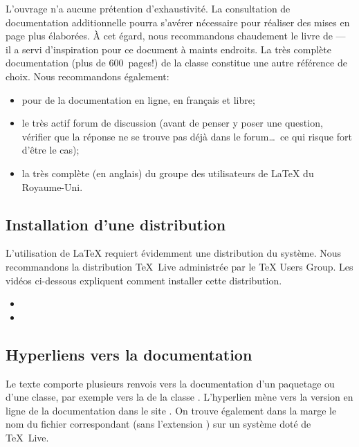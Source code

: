 L'ouvrage n'a aucune prétention d'exhaustivité. La consultation de
documentation additionnelle pourra s'avérer nécessaire pour réaliser
des mises en page plus élaborées. À cet égard, nous recommandons
chaudement le livre de \citet{Kopka:latex:4e} --- il a servi
d'inspiration pour ce document à maints endroits. La très complète
documentation (plus de 600~pages!) de la classe 
\citep{memoir} constitue une autre référence de choix. Nous
recommandons également:
\begin{itemize}
\item {} pour de la documentation en ligne, en français et
  libre;
\item le très actif forum de discussion
  (avant de penser y poser une question, vérifier que la réponse ne se trouve
  pas déjà dans le forum\dots\ ce qui risque fort d'être le cas);
\item la très complète
   (en anglais) du groupe des
  utilisateurs de {\LaTeX} du Royaume-Uni.
\end{itemize}

\subsection*{Installation d'une distribution}

L'utilisation de {\LaTeX} requiert évidemment une distribution du
système. Nous recommandons la distribution {\TeX}~Live administrée par
le {\TeX} Users Group. Les vidéos ci-dessous expliquent comment
installer cette distribution.
\begin{itemize}
\item {}
\item {}
\end{itemize}

\subsection*{Hyperliens vers la documentation}

Le texte comporte plusieurs renvois vers la documentation d'un
paquetage ou d'une classe, par exemple vers la %
de la classe . L'hyperlien mène vers la version en ligne
de la documentation dans le site %
. On trouve également dans la
marge le nom du fichier correspondant (sans l'extension )
sur un système doté de {\TeX}~Live.

